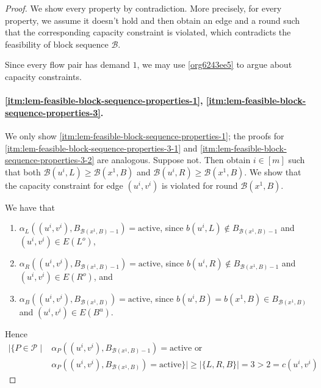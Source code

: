 \documentclass[fontsize=11pt,paper=a4]{book}
\begin{document}
\begin{proof}
We show every property by contradiction.
More precisely, for every property, we assume it doesn't hold and then obtain an edge and a round such that the corresponding capacity constraint is violated, which contradicts the feasibility of block sequence \(\mathcal{B}\).

Since every flow pair has demand \(1\), we may use \ref{org6243ee5} to argue about capacity constraints.

\paragraph{\ref{itm:lem-feasible-block-sequence-properties-1}, \ref{itm:lem-feasible-block-sequence-properties-3}.}
We only show \ref{itm:lem-feasible-block-sequence-properties-1}; the proofs for \ref{itm:lem-feasible-block-sequence-properties-3-1} and \ref{itm:lem-feasible-block-sequence-properties-3-2} are analogous.
Suppose not.
Then obtain \(i\in[m]\) such that both \(\mathcal{B}(u^i,L)\geq\mathcal{B}(x^1,B)\) and \(\mathcal{B}(u^i,R)\geq\mathcal{B}(x^1,B)\).
We show that the capacity constraint for edge \((u^i,v^i)\) is violated for round \(\mathcal{B}(x^1,B)\).

We have that

\begin{enumerate}
\item \(\alpha_L((u^i,v^i),B_{\mathcal{B}(x^1,B)-1})=\mathrm{active}\), since \(b(u^i,L)\notin B_{\mathcal{B}(x^1,B)-1}\) and \((u^i,v^i)\in E(L^o)\),

\item \(\alpha_R((u^i,v^i),B_{\mathcal{B}(x^1,B)-1})=\mathrm{active}\), since \(b(u^i,R)\notin B_{\mathcal{B}(x^1,B)-1}\) and \((u^i,v^i)\in E(R^o)\), and

\item \(\alpha_B((u^i,v^i),B_{\mathcal{B}(x^1,B)})=\mathrm{active}\), since \(b(u^i,B)=b(x^1,B)\in B_{\mathcal{B}(x^1,B)}\) and \((u^i,v^i)\in E(B^u)\).
\end{enumerate}

Hence
\begin{align*}
\lvert\{P\in\mathcal{P}\mid&\alpha_P((u^i,v^i),B_{\mathcal{B}(x^1,B)-1})=\mathrm{active}\text{ or }\\
&\alpha_P((u^i,v^i),B_{\mathcal{B}(x^1,B)})=\mathrm{active}\}\rvert\geq\lvert\{L,R,B\}\rvert=3>2=c(u^i,v^i)
\end{align*}


\end{proof}
\end{document}

